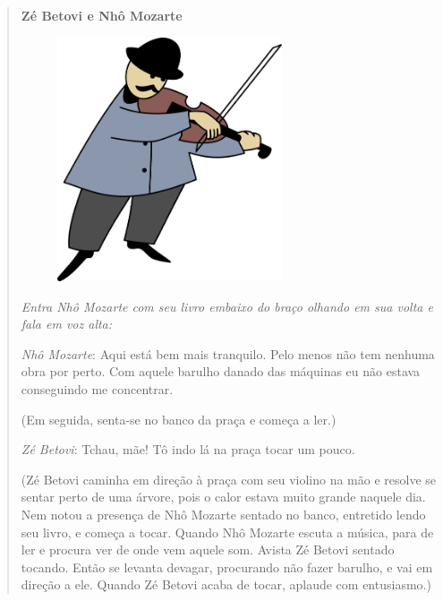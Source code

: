 

\begin{quote}
\textbf{Zé Betovi e Nhô Mozarte}

\begin{figure}
\includegraphics[width=2.61389in,height=2.83858in]{./media/image2.png}
\end{figure}

\textit{Entra Nhô Mozarte com seu livro embaixo do braço olhando em
sua volta e fala em voz alta:}

\emph{Nhô Mozarte}: Aqui está bem mais tranquilo. Pelo menos não tem
nenhuma obra por perto. Com aquele barulho danado das máquinas eu não
estava conseguindo me concentrar.

(Em seguida, senta-se no banco da praça e começa a ler.)

\emph{Zé Betovi}: Tchau, mãe! Tô indo lá na praça tocar um pouco.

(Zé Betovi caminha em
direção à praça com seu violino na mão e resolve se sentar perto de uma
árvore, pois o calor estava muito grande naquele dia. Nem notou a
presença de Nhô Mozarte sentado no banco, entretido lendo seu livro, e
começa a tocar. Quando Nhô Mozarte escuta a música, para de ler e
procura ver de onde vem aquele som. Avista Zé Betovi sentado tocando.
Então se levanta devagar, procurando não fazer barulho, e vai em direção
a ele. Quando Zé Betovi acaba de tocar, aplaude com entusiasmo.)


\end{quote}
